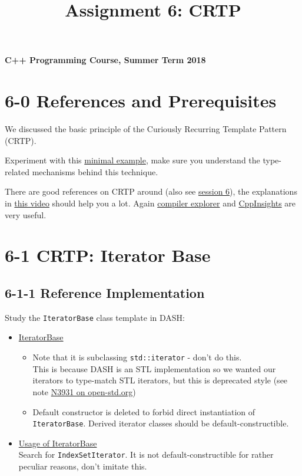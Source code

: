 \documentclass[]{article}
\title{Assignment 6: CRTP}
\date{}
\providecommand{\tightlist}{%
  \setlength{\itemsep}{0pt}\setlength{\parskip}{0pt}}
\begin{document}
\maketitle

\textbf{C++ Programming Course, Summer Term 2018}

\section{6-0 References and
Prerequisites}\label{references-and-prerequisites}

We discussed the basic principle of the Curiously Recurring Template
Pattern (CRTP).

Experiment with this
\href{/session-06/01-static-virtual/static_polymorph.h}{minimal
example}, make sure you understand the type-related mechanisms behind
this technique.

There are good references on CRTP around (also see
\href{/session-06/session-06}{session 6}), the explanations in
\href{https://www.youtube.com/watch?v=2AwZRWt2suc}{this video} should
help you a lot. Again \href{http://godbolt.org}{compiler explorer} and
\href{http://cppinsights.io}{CppInsights} are very useful.

\section{6-1 CRTP: Iterator Base}\label{crtp-iterator-base}

\subsection{6-1-1 Reference
Implementation}\label{reference-implementation}

Study the \texttt{IteratorBase} class template in DASH:

\begin{itemize}
\tightlist
\item
  \href{https://github.com/dash-project/dash/blob/development/dash/include/dash/iterator/internal/IteratorBase.h}{IteratorBase}

  \begin{itemize}
  \tightlist
  \item
    Note that it is subclassing \texttt{std::iterator} - don't do
    this.\\
     This is because DASH is an STL implementation so we wanted our
    iterators to type-match STL iterators, but this is deprecated style
    (see note
    \href{http://www.open-std.org/jtc1/sc22/wg21/docs/papers/2014/n3931.html\#52}{N3931
    on open-std.org})
  \item
    Default constructor is deleted to forbid direct instantiation of
    \texttt{IteratorBase}. Derived iterator classes should be
    default-constructible.
  \end{itemize}
\item
  \href{https://github.com/dash-project/dash/blob/development/dash/include/dash/view/IndexSet.h}{Usage
  of IteratorBase}\\
   Search for \texttt{IndexSetIterator}. It is not default-constructible
  for rather peculiar reasons, don't imitate this.
\end{itemize}
\end{document}
